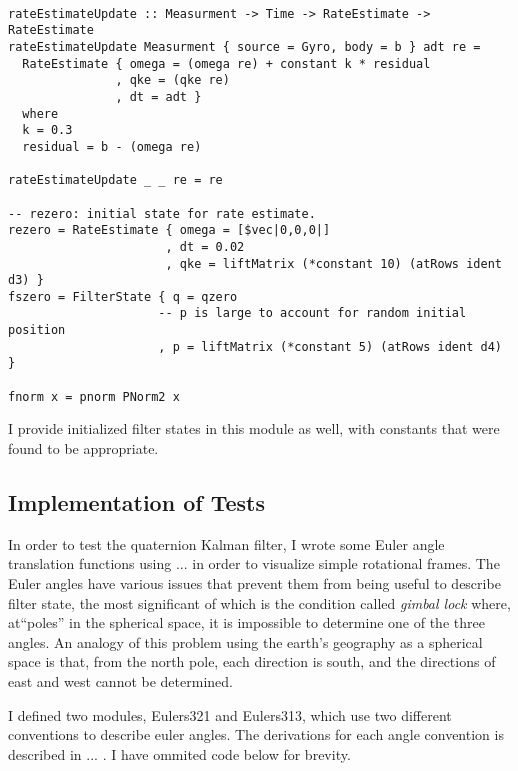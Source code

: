 \documentclass[12pt]{report}
\begin{document}
\begin{lstlisting}

rateEstimateUpdate :: Measurment -> Time -> RateEstimate -> RateEstimate
rateEstimateUpdate Measurment { source = Gyro, body = b } adt re = 
  RateEstimate { omega = (omega re) + constant k * residual
               , qke = (qke re)
               , dt = adt }
  where 
  k = 0.3
  residual = b - (omega re)

rateEstimateUpdate _ _ re = re 

-- rezero: initial state for rate estimate. 
rezero = RateEstimate { omega = [$vec|0,0,0|]
                      , dt = 0.02
                      , qke = liftMatrix (*constant 10) (atRows ident d3) }
fszero = FilterState { q = qzero
                     -- p is large to account for random initial position
                     , p = liftMatrix (*constant 5) (atRows ident d4) }

fnorm x = pnorm PNorm2 x
\end{lstlisting}
I provide initialized filter states in this module as well, with constants that were found to be appropriate.

\subsection{Implementation of Tests}
In order to test the quaternion Kalman filter, I wrote some Euler angle translation functions using ... in order to visualize simple rotational frames. The Euler angles have various issues that prevent them from being useful to describe filter state, the most significant of which is the condition called \emph{gimbal lock} where, at``poles'' in the spherical space, it is impossible to determine one of the three angles. An analogy of this problem using the earth's geography as a spherical space is that, from the north pole, each direction is south, and the directions of east and west cannot be determined.

I defined two modules, Eulers321 and Eulers313, which use two different conventions to describe euler angles. The derivations for each angle convention is described in ... . I have ommited code below for brevity.
\end{document}

